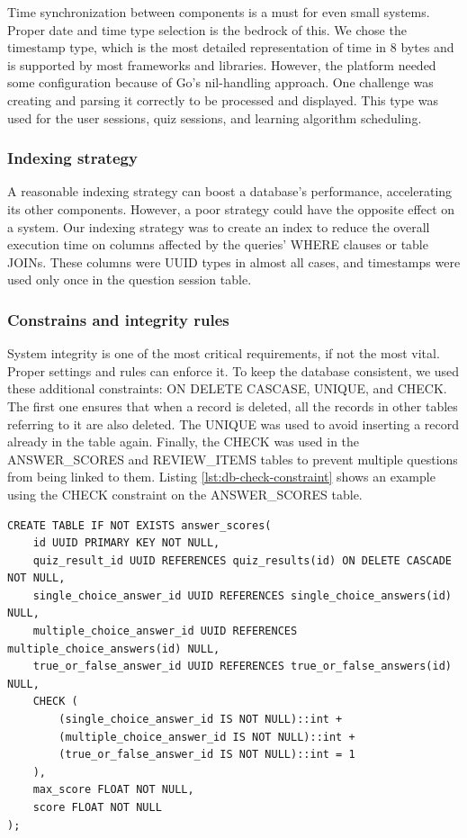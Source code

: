 Time synchronization between components is a must for even small systems. Proper date and time type selection is the bedrock of this. We chose the timestamp type, which is the most detailed representation of time in 8 bytes and is supported by most frameworks and libraries. However, the platform needed some configuration because of Go's nil-handling approach. One challenge was creating and parsing it correctly to be processed and displayed. This type was used for the user sessions, quiz sessions, and learning algorithm scheduling.

\subsubsection{Indexing strategy}

A reasonable indexing strategy can boost a database's performance, accelerating its other components. However, a poor strategy could have the opposite effect on a system. Our indexing strategy was to create an index to reduce the overall execution time on columns affected by the queries' WHERE clauses or table JOINs. These columns were UUID types in almost all cases, and timestamps were used only once in the question session table.

\subsubsection{Constrains and integrity rules}

System integrity is one of the most critical requirements, if not the most vital. Proper settings and rules can enforce it. To keep the database consistent, we used these additional constraints: ON DELETE CASCASE, UNIQUE, and CHECK. The first one ensures that when a record is deleted, all the records in other tables referring to it are also deleted. The UNIQUE was used to avoid inserting a record already in the table again. Finally, the CHECK was used in the ANSWER\_SCORES and REVIEW\_ITEMS tables to prevent multiple questions from being linked to them. Listing \ref{lst:db-check-constraint} shows an example using the CHECK constraint on the ANSWER\_SCORES table.

\begin{lstlisting}[caption=Using CHECK constraint,label=lst:db-check-constraint]
CREATE TABLE IF NOT EXISTS answer_scores(
    id UUID PRIMARY KEY NOT NULL,
    quiz_result_id UUID REFERENCES quiz_results(id) ON DELETE CASCADE NOT NULL,
    single_choice_answer_id UUID REFERENCES single_choice_answers(id) NULL,
    multiple_choice_answer_id UUID REFERENCES multiple_choice_answers(id) NULL,
    true_or_false_answer_id UUID REFERENCES true_or_false_answers(id) NULL,
    CHECK (
        (single_choice_answer_id IS NOT NULL)::int +
        (multiple_choice_answer_id IS NOT NULL)::int +
        (true_or_false_answer_id IS NOT NULL)::int = 1
    ),
    max_score FLOAT NOT NULL,
    score FLOAT NOT NULL
);
\end{lstlisting}

